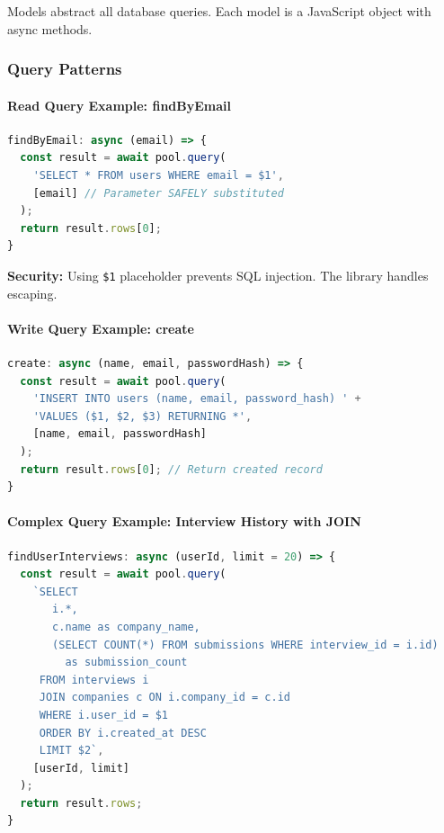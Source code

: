 \documentclass[12pt,a4paper,oneside]{article}
\begin{document}
Models abstract all database queries. Each model is a JavaScript object with async methods.

\subsubsection{Query Patterns}

\paragraph{Read Query Example: findByEmail}

\begin{lstlisting}[language=JavaScript, caption=Safe SQL Query with Parameterization]
findByEmail: async (email) => {
  const result = await pool.query(
    'SELECT * FROM users WHERE email = $1',
    [email] // Parameter SAFELY substituted
  );
  return result.rows[0];
}
\end{lstlisting}

\textbf{Security:} Using \texttt{\$1} placeholder prevents SQL injection. The library handles escaping.

\paragraph{Write Query Example: create}

\begin{lstlisting}[language=JavaScript, caption=INSERT with RETURNING]
create: async (name, email, passwordHash) => {
  const result = await pool.query(
    'INSERT INTO users (name, email, password_hash) ' +
    'VALUES ($1, $2, $3) RETURNING *',
    [name, email, passwordHash]
  );
  return result.rows[0]; // Return created record
}
\end{lstlisting}

\paragraph{Complex Query Example: Interview History with JOIN}

\begin{lstlisting}[language=JavaScript, caption=JOIN Query with Aggregation]
findUserInterviews: async (userId, limit = 20) => {
  const result = await pool.query(
    `SELECT 
       i.*, 
       c.name as company_name,
       (SELECT COUNT(*) FROM submissions WHERE interview_id = i.id) 
         as submission_count
     FROM interviews i
     JOIN companies c ON i.company_id = c.id
     WHERE i.user_id = $1 
     ORDER BY i.created_at DESC 
     LIMIT $2`,
    [userId, limit]
  );
  return result.rows;
}
\end{lstlisting}
\end{document}
